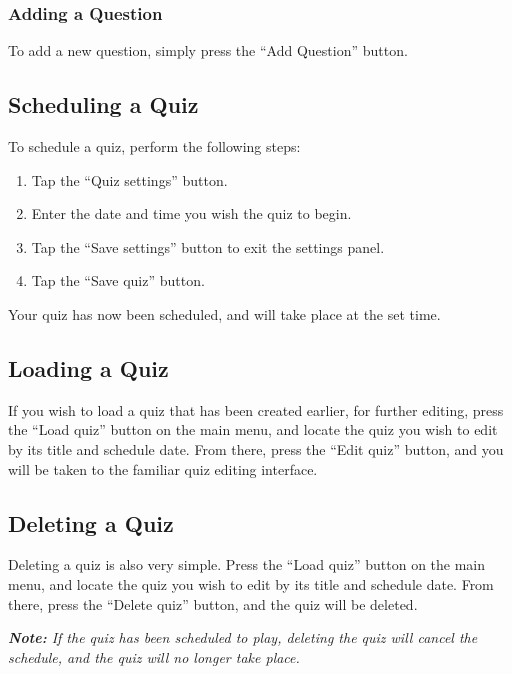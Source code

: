 \subsubsection{Adding a Question} %
\label{ssub:adding_a_question}
To add a new question, simply press the ``Add Question'' button.


\subsection{Scheduling a Quiz} %
\label{sub:scheduling_a_quiz}
To schedule a quiz, perform the following steps:

\begin{enumerate}
\item Tap the ``Quiz settings'' button.
\item Enter the date and time you wish the quiz to begin.
\item Tap the ``Save settings'' button to exit the settings panel.
\item Tap the ``Save quiz'' button.
\end{enumerate}

Your quiz has now been scheduled, and will take place at the set time.

\subsection{Loading a Quiz} %
\label{sub:loading_a_quiz}
If you wish to load a quiz that has been created earlier, for further editing, press the ``Load quiz'' button on the main menu, and locate the quiz you wish to edit by its title and schedule date. From there, press the ``Edit quiz'' button, and you will be taken to the familiar quiz editing interface.

\subsection{Deleting a Quiz} %
\label{sub:deleting_a_quiz}
Deleting a quiz is also very simple. Press the ``Load quiz'' button on the main menu, and locate the quiz you wish to edit by its title and schedule date. From there, press the ``Delete quiz'' button, and the quiz will be deleted.

\textit{\textbf{Note:} If the quiz has been scheduled to play, deleting the quiz will cancel the schedule, and the quiz will no longer take place.}
